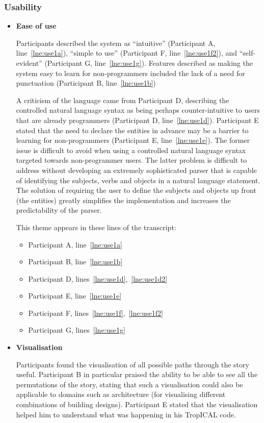 \documentclass[11pt]{report}
\newcommand{\lref}[1]{\hyperlink{llineno:#1}{\ref*{#1}}}
\begin{document}
\subsubsection{Usability}
\begin{itemize}
\item \textbf{Ease of use}

Participants described the system as ``intuitive'' (Participant A,
line~\lref{lne:use1a}), ``simple to use'' (Participant F,
line~\lref{lne:use1f2}), and ``self-evident'' (Participant G, line~\lref{lne:use1g}). Features described as making the system easy to learn
for non-programmers included the lack of a need for punctuation (Participant B, line~\lref{lne:use1b})

A criticism of the language came from Participant D, describing the controlled
natural language syntax as being perhaps counter-intuitive to users that are already programmers (Participant D,
line~\lref{lne:use1d}). Participant E stated that the need to declare the
entities in advance may be a barrier to learning for non-programmers
(Participant E, line~\lref{lne:use1e}). The former issue is difficult to
avoid when using a controlled natural language syntax targeted towards
non-programmer users. The latter problem is difficult to address without
developing an extremely sophisticated parser that is capable of identifying the
subjects, verbs and objects in a natural language statement. The solution of
requiring the user to define the subjects and objects up front (the entities)
greatly simplifies the implementation and increases the predictability of the parser.

This theme appears in these lines of the transcript:

\begin{itemize}
\item Participant A, line~\lref{lne:use1a}
\item Participant B, line~\lref{lne:use1b}
\item Participant D, lines~\lref{lne:use1d},~\lref{lne:use1d2}
\item Participant E, line~\lref{lne:use1e}
\item Participant F, lines~\lref{lne:use1f},~\lref{lne:use1f2}
\item Participant G, lines~\lref{lne:use1g}
\end{itemize}

\item \textbf{Visualisation}

Participants found the visualisation of all possible paths through the story
useful. Participant B in particular praised the ability to be able to see all
the permutations of the story, stating that such a visualisation could also be
applicable to domains such as architecture (for visualising different
combinations of building designs). Participant E stated that the visualisation
helped him to understand what was happening in his TropICAL code.


\end{itemize}
\end{document}
